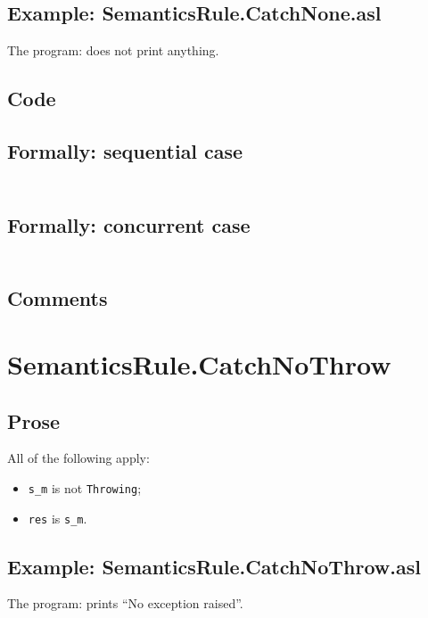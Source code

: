 \documentclass{book}
\begin{document}
    \subsection{Example: SemanticsRule.CatchNone.asl}
    The program:
    does not print anything.

  \subsection{Code}

  \subsection{Formally: sequential case}
  \begin{align}
  \end{align} 

  \subsection{Formally: concurrent case}
  \begin{align}
  \end{align} 

    \subsection{Comments}

\section{SemanticsRule.CatchNoThrow \label{sec:SemanticsRule.CatchNoThrow}}

    \subsection{Prose}
    All of the following apply:
    \begin{itemize}
    \item \texttt{s\_m} is not \texttt{Throwing};
    \item \texttt{res} is \texttt{s\_m}.
    \end{itemize}

    \subsection{Example: SemanticsRule.CatchNoThrow.asl}
    The program:
    prints ``No exception raised''.
\end{document}
